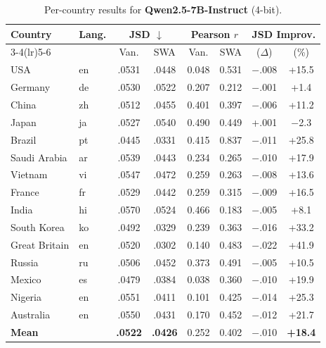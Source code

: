 \documentclass{article}
\newcommand{\gain}[1]{\textcolor{improvegreen}{#1}}
\newcommand{\loss}[1]{\textcolor{worsered}{#1}}
\begin{document}
\begin{table}[h]
\caption{Per-country results for \textbf{Qwen2.5-7B-Instruct} (4-bit).}
\label{tab:qwen7b_percountry}
\centering\setlength{\tabcolsep}{3.5pt}\footnotesize
\begin{tabular}{llcccccc}
\toprule
Country & Lang. & \multicolumn{2}{c}{JSD $\downarrow$} & \multicolumn{2}{c}{Pearson $r$} & \multicolumn{2}{c}{JSD Improv.} \\
\cmidrule(lr){3-4}\cmidrule(lr){5-6}
 & & Van. & SWA & Van. & SWA & ($\Delta$) & (\%) \\
\midrule
USA & en &.0531 &.0448 & 0.048 & 0.531 & $-$.008 & \gain{+15.5} \\
Germany & de &.0530 &.0522 & 0.207 & 0.212 & $-$.001 & \gain{+1.4} \\
China & zh &.0512 &.0455 & 0.401 & 0.397 & $-$.006 & \gain{+11.2} \\
Japan & ja &.0527 &.0540 & 0.490 & 0.449 & +.001 & \loss{$-$2.3} \\
Brazil & pt &.0445 &.0331 & 0.415 & 0.837 & $-$.011 & \gain{+25.8} \\
Saudi Arabia& ar &.0539 &.0443 & 0.234 & 0.265 & $-$.010 & \gain{+17.9} \\
Vietnam & vi &.0547 &.0472 & 0.259 & 0.263 & $-$.008 & \gain{+13.6} \\
France & fr &.0529 &.0442 & 0.259 & 0.315 & $-$.009 & \gain{+16.5} \\
India & hi &.0570 &.0524 & 0.466 & 0.183 & $-$.005 & \gain{+8.1} \\
South Korea & ko &.0492 &.0329 & 0.239 & 0.363 & $-$.016 & \gain{+33.2} \\
Great Britain& en&.0520 &.0302 & 0.140 & 0.483 & $-$.022 & \gain{+41.9} \\
Russia & ru &.0506 &.0452 & 0.373 & 0.491 & $-$.005 & \gain{+10.5} \\
Mexico & es &.0479 &.0384 & 0.038 & 0.360 & $-$.010 & \gain{+19.9} \\
Nigeria & en &.0551 &.0411 & 0.101 & 0.425 & $-$.014 & \gain{+25.3} \\
Australia & en &.0550 &.0431 & 0.170 & 0.452 & $-$.012 & \gain{+21.7} \\
\midrule
\textbf{Mean} & & \textbf{.0522} & \textbf{.0426} & 0.252 & 0.402 & $-$.010 & \gain{\textbf{+18.4}} \\
\bottomrule
\end{tabular}
\end{table}
\end{document}
